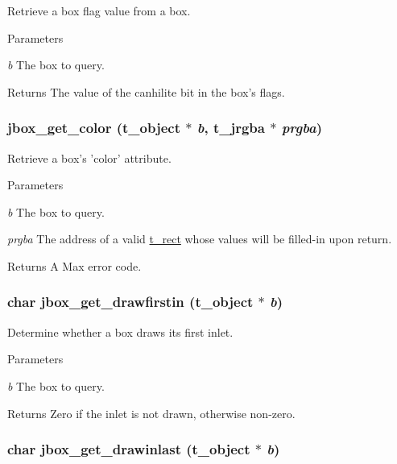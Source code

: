 Retrieve a box flag value from a box. 
\begin{DoxyParams}{Parameters}
\item[{\em b}]The box to query. \end{DoxyParams}
\begin{DoxyReturn}{Returns}
The value of the canhilite bit in the box's flags. 
\end{DoxyReturn}
\hypertarget{group__jbox_ga03c4056e731c28342a8ee17e5b86558f}{
\subsubsection[{jbox\_\-get\_\-color}]{ jbox\_\-get\_\-color ({\bf t\_\-object} $\ast$ {\em b}, \/  {\bf t\_\-jrgba} $\ast$ {\em prgba})}}
\label{group__jbox_ga03c4056e731c28342a8ee17e5b86558f}


Retrieve a box's 'color' attribute. 
\begin{DoxyParams}{Parameters}
\item[{\em b}]The box to query. \item[{\em prgba}]The address of a valid \hyperlink{structt__rect}{t\_\-rect} whose values will be filled-\/in upon return. \end{DoxyParams}
\begin{DoxyReturn}{Returns}
A Max error code. 
\end{DoxyReturn}
\hypertarget{group__jbox_gaae56c5cb39f5835b702846e557400522}{
\subsubsection[{jbox\_\-get\_\-drawfirstin}]{\setlength{\rightskip}{0pt plus 5cm}char jbox\_\-get\_\-drawfirstin ({\bf t\_\-object} $\ast$ {\em b})}}
\label{group__jbox_gaae56c5cb39f5835b702846e557400522}


Determine whether a box draws its first inlet. 
\begin{DoxyParams}{Parameters}
\item[{\em b}]The box to query. \end{DoxyParams}
\begin{DoxyReturn}{Returns}
Zero if the inlet is not drawn, otherwise non-\/zero. 
\end{DoxyReturn}
\hypertarget{group__jbox_ga6e3d12a65d25b0e518ca1e246d132a7a}{
\subsubsection[{jbox\_\-get\_\-drawinlast}]{\setlength{\rightskip}{0pt plus 5cm}char jbox\_\-get\_\-drawinlast ({\bf t\_\-object} $\ast$ {\em b})}}
\label{group__jbox_ga6e3d12a65d25b0e518ca1e246d132a7a}


